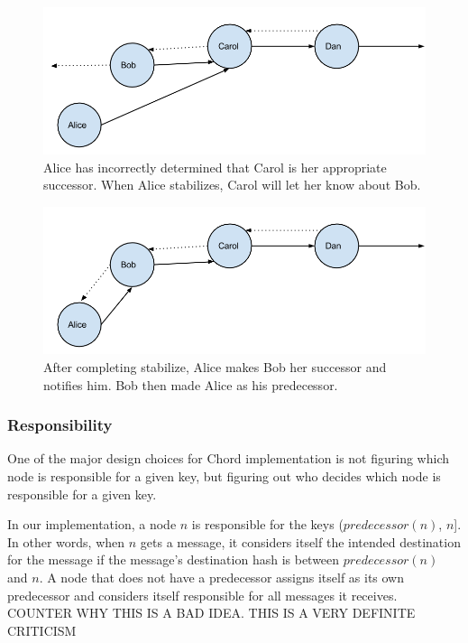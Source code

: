 \documentclass[conference, compsocconf, letterpaper]{IEEEtran}
\begin{document}
\begin{figure}
    \includegraphics[width=\linewidth]{abcd1}
    \caption{Alice has incorrectly determined that Carol is her appropriate successor.  When Alice stabilizes, Carol will let her know about Bob.}
    \label{abcd1}
\end{figure}


\begin{figure}
    \includegraphics[width=\linewidth]{abcd2}
    \caption{After completing stabilize, Alice makes Bob her successor and notifies him. Bob then made Alice as his predecessor.}
    \label{abcd2}
\end{figure}



\subsubsection{Responsibility}
One of the major design choices for Chord implementation is not figuring which node is responsible for a given key, but figuring out who decides which node is responsible for a given key.


In our implementation, a node $n$ is responsible for the keys ($predecessor(n)$, $n$].  In other words, when $n$ gets a message, it considers itself the intended destination for the message if the message's destination hash is between $predecessor(n)$ and $n$.  A node that does not have a predecessor assigns itself as its own predecessor and considers itself responsible for all messages it receives.  COUNTER WHY THIS IS A BAD IDEA.  THIS IS A VERY DEFINITE CRITICISM 
\end{document}
